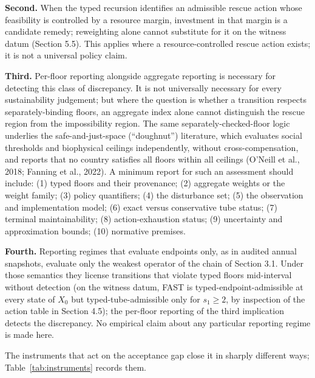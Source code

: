 \documentclass[review,11pt]{elsarticle}
\begin{document}
\textbf{Second.} When the typed recursion identifies an admissible
rescue action whose feasibility is controlled by a resource margin,
investment in that margin is a candidate remedy; reweighting alone cannot substitute for it on the witness datum (Section 5.5). This applies where a resource-controlled rescue action exists; it is not a universal policy claim.

\textbf{Third.} Per-floor reporting alongside aggregate reporting is
necessary for detecting this class of discrepancy. It is not universally
necessary for every sustainability judgement; but where the question is
whether a transition respects separately-binding floors, an aggregate
index alone cannot distinguish the rescue region from the impossibility region. The same separately-checked-floor logic underlies the safe-and-just-space (``doughnut'') literature, which evaluates social thresholds and biophysical ceilings independently, without cross-compensation, and reports that no country satisfies all floors within all ceilings (O'Neill et al., 2018; Fanning et al., 2022). A minimum report for such an assessment should include: (1)
typed floors and their provenance; (2) aggregate weights or the weight
family; (3) policy quantifiers; (4) the disturbance set; (5) the
observation and implementation model; (6) exact versus conservative tube
status; (7) terminal maintainability; (8) action-exhaustion status; (9)
uncertainty and approximation bounds; (10) normative premises.

\textbf{Fourth.} Reporting regimes that evaluate endpoints only, as in audited annual snapshots, evaluate only the weakest operator of the chain of Section 3.1. Under those semantics they license transitions that violate typed floors mid-interval without detection (on the witness datum, FAST is typed-endpoint-admissible at every state of \(X_0\) but typed-tube-admissible only for \(s_1 \ge 2\), by inspection of the action table in Section 4.5); the per-floor reporting of the third implication detects the discrepancy. No empirical claim about any particular reporting regime is made here.

The instruments that act on the acceptance gap close it in sharply
different ways; Table~\ref{tab:instruments} records them.
\end{document}
